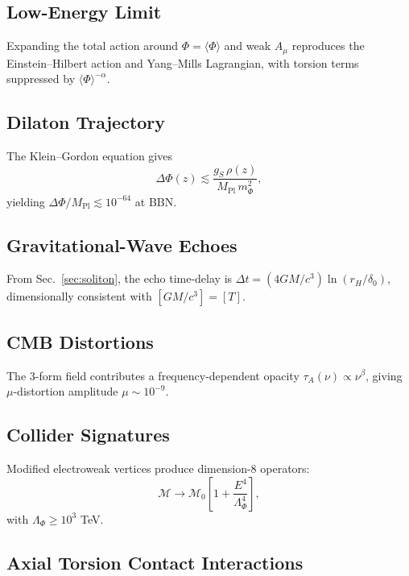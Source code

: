 \documentclass[twocolumn,prd,amsmath,amssymb]{revtex4-2}
\newcommand{\Pl}{M_{\text{Pl}}}
\begin{document}
\subsection{Low-Energy Limit}

Expanding the total action around $\Phi = \langle\Phi\rangle$ and weak $A_{\mu}$
reproduces the Einstein--Hilbert action and Yang--Mills Lagrangian, with torsion terms
suppressed by $\langle\Phi\rangle^{-\alpha}$.

\subsection{Dilaton Trajectory}

The Klein--Gordon equation gives
\begin{equation}
\Delta\Phi(z) \lesssim \frac{g_S\,\rho(z)}{\Pl\,m_\Phi^2},
\label{eq:delta-phi}
\end{equation}
yielding $\Delta\Phi/\Pl \lesssim 10^{-64}$ at BBN.

\subsection{Gravitational-Wave Echoes}

From Sec.~\ref{sec:soliton}, the echo time-delay is $\Delta t = (4GM/c^3)\ln(r_H/\delta_0)$,
dimensionally consistent with $[GM/c^3] = [T]$.

\subsection{CMB Distortions}

The 3-form field contributes a frequency-dependent opacity $\tau_{A}(\nu) \propto \nu^{\beta}$,
giving $\mu$-distortion amplitude $\mu \sim 10^{-9}$.

\subsection{Collider Signatures}

Modified electroweak vertices produce dimension-8 operators:
\begin{equation}
\mathcal{M} \to \mathcal{M}_0\left[1 + \frac{E^{4}}{\Lambda_{\Phi}^{4}}\right],
\label{eq:collider}
\end{equation}
with $\Lambda_{\Phi} \ge 10^3$ TeV.

\subsection{Axial Torsion Contact Interactions}
\end{document}
